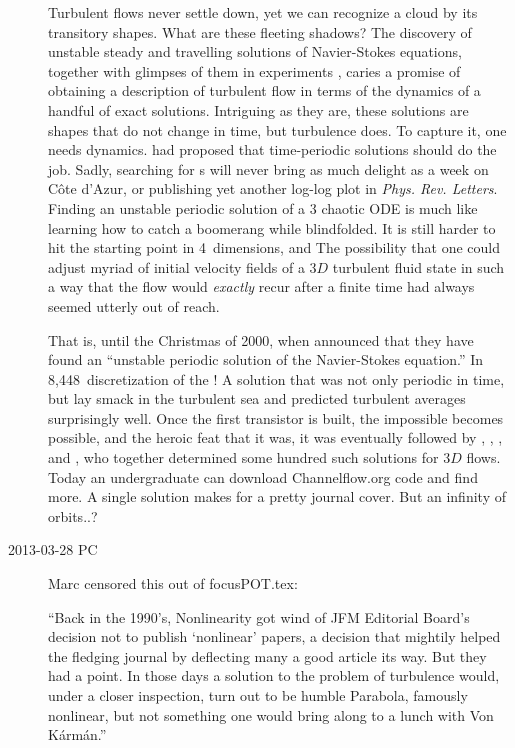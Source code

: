 \begin{description}
Turbulent flows never settle down, yet we can recognize a cloud by
its transitory shapes. What are these fleeting shadows? The discovery
of unstable steady and travelling solutions of Navier-Stokes
equations, together with glimpses of them in experiments
\citep{science04}, caries a promise of obtaining a description of
turbulent flow in terms of the dynamics of a handful of exact
solutions. Intriguing as they are, these solutions are shapes that do
not change in time, but turbulence does. To capture it, one needs
dynamics. \cite{MS66} had proposed that time-periodic solutions
should do the job.
Sadly, searching for \po s will never bring as
much delight as a week on C\^{o}te d'Azur, or publishing yet another
log-log plot in {\em Phys. Rev. Letters}. Finding an unstable
periodic solution of a 3{\dmn} chaotic ODE is much like learning how
to catch a boomerang while blindfolded. It is still harder to hit the
starting point in 4~dimensions, and
The possibility that one could
adjust myriad of initial velocity fields of a 3$D$ turbulent fluid
state in such a way that the flow would \emph{exactly} recur after a
finite time had always seemed utterly out of reach.

That is, until the Christmas of 2000, when \cite{KawKida01} announced
that they have found an ``unstable periodic solution of the
Navier-Stokes equation.'' In 8,448\dmn\ discretization of the \pCf! A
solution that was not only periodic in time, but lay smack in the
turbulent sea and predicted turbulent averages surprisingly well.
Once the first transistor is built, the impossible becomes possible,
and the heroic feat that it was, it was eventually followed by
\cite{Visw07b}, \cite{CviGib10}, \cite{KreEck12}, and \cite{ACHKW11},
who together determined some hundred such solutions for 3$D$ flows.
Today an undergraduate can download
 {Channelflow.org} code and find
more. A single solution makes for a pretty journal cover. But
an infinity of orbits..?

\item[2013-03-28 PC]                \toCB
Marc censored this out of focusPOT.tex:

``Back in the 1990's, Nonlinearity got wind of JFM Editorial Board's
decision not to publish `nonlinear' papers, a decision that mightily
helped the fledging journal by deflecting many a good article its way.
But they had a point. In those days a solution to the problem of
turbulence would, under a closer inspection, turn out to be humble
Parabola, famously nonlinear, but not something one would bring along to
a lunch with Von K\'arm\'an.'' 

\end{description}


